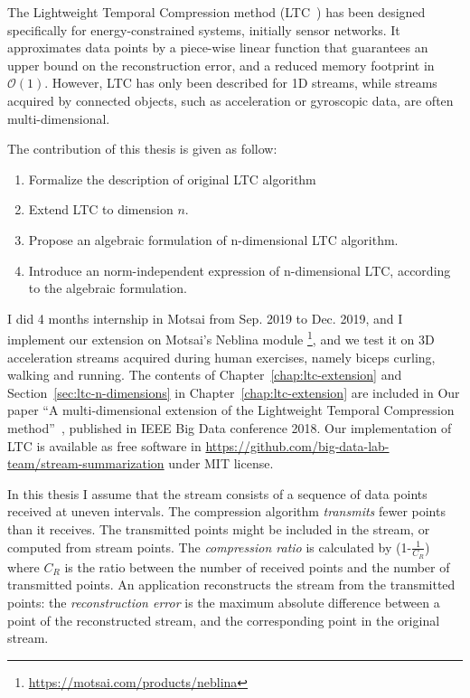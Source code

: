 The Lightweight Temporal Compression method
(LTC~\cite{schoellhammer2004lightweight}) has been designed  specifically for
energy-constrained systems, initially sensor networks.  It approximates data
points by a piece-wise linear function that  guarantees an upper bound on the
reconstruction error, and a reduced  memory footprint in $\mathcal{O}(1)$.
However, LTC has only been  described for 1D streams, while streams acquired by
connected objects, such as  acceleration or gyroscopic data, are often
multi-dimensional. 



The contribution of this thesis is given as follow:
\begin{enumerate}
  \item Formalize the description of original LTC algorithm
  \item Extend LTC to dimension $n$.
  \item Propose an algebraic formulation of n-dimensional LTC algorithm.
  \item Introduce an norm-independent expression of n-dimensional LTC, according
  to the algebraic formulation.
\end{enumerate}


I did 4 months internship in Motsai from Sep. 2019 to Dec. 2019, and I implement
our extension on Motsai's Neblina module
\footnote{\url{https://motsai.com/products/neblina}}, and we test it on 3D
acceleration streams acquired during human exercises, namely biceps curling,
walking and running. The contents of Chapter~\ref{chap:ltc-extension} and
Section~\ref{sec:ltc-n-dimensions} in Chapter~\ref{chap:ltc-extension} are
included in Our paper ``A multi-dimensional extension of the Lightweight
Temporal Compression method''~\cite{li2018multi}, published in IEEE Big Data
conference 2018. Our implementation of LTC is available as free software in
\url{https://github.com/big-data-lab-team/stream-summarization} under MIT
license.



In this thesis I assume that the stream consists of a sequence of data points
received at uneven intervals. The compression algorithm \emph{transmits} fewer
points than it receives. The transmitted points might be included in the
stream, or computed from stream points. The \emph{compression ratio} is
calculated by (1-$\frac{1}{C_R}$) where $C_R$ is the ratio between the number of
received points and the number of transmitted points. An application
reconstructs the stream from the transmitted points: the \emph{reconstruction
error} is the maximum absolute difference between a point of the reconstructed
stream, and the corresponding point in the original stream.

